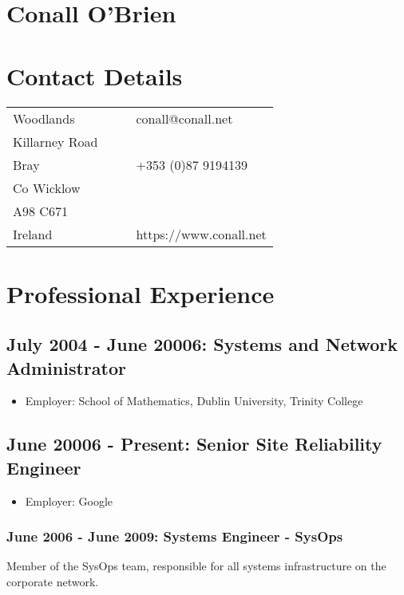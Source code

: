 \documentclass[a4paper, 11pt] {article}
\begin{document}
\section*{Conall O'Brien}

\section*{Contact Details}

\begin{tabular}{l l l l}
Woodlands		&	&			& conall@conall.net 	  	\\
Killarney Road		&	&			&				\\
Bray	 		&	&			& +353 (0)87 9194139 		\\
Co Wicklow		&	&			& 				\\
A98 C671		&	&			& 				\\
Ireland			&  	&			& https://www.conall.net	\\
\end{tabular}

\section*{Professional Experience}

\subsection*{July 2004 - June 20006: Systems and Network Administrator}

\begin{itemize}
\item Employer: School of Mathematics, Dublin University, Trinity College
\end{itemize}

\subsection*{June 20006 - Present: Senior Site Reliability Engineer}

\begin{itemize}
\item Employer: Google
\end{itemize}

\subsubsection*{June 2006 - June 2009: Systems Engineer - SysOps}

Member of the SysOps team, responsible for all systems infrastructure on the corporate network.
\end{document}

